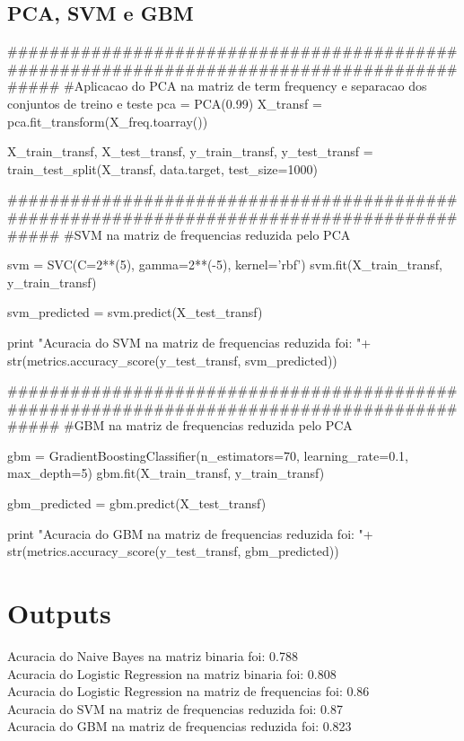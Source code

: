 \documentclass{article}
\begin{document}
\subsection{PCA, SVM e GBM}
\begin{tcolorbox}
\begin{python}
###########################################################################################
#Aplicacao do PCA na matriz de term frequency e separacao dos conjuntos de treino e teste
pca = PCA(0.99)
X_transf = pca.fit_transform(X_freq.toarray())

X_train_transf, X_test_transf, y_train_transf, y_test_transf = train_test_split(X_transf, 
   data.target, test_size=1000)

###########################################################################################
#SVM na matriz de frequencias reduzida pelo PCA

svm = SVC(C=2**(5), gamma=2**(-5), kernel='rbf')
svm.fit(X_train_transf, y_train_transf)

svm_predicted = svm.predict(X_test_transf)

print "Acuracia do SVM na matriz de frequencias reduzida foi: "+
   str(metrics.accuracy_score(y_test_transf, svm_predicted))

###########################################################################################
#GBM na matriz de frequencias reduzida pelo PCA

gbm = GradientBoostingClassifier(n_estimators=70, learning_rate=0.1, max_depth=5)
gbm.fit(X_train_transf, y_train_transf)

gbm_predicted = gbm.predict(X_test_transf)

print "Acuracia do GBM na matriz de frequencias reduzida foi: "+
   str(metrics.accuracy_score(y_test_transf, gbm_predicted))
\end{python}
\end{tcolorbox}

\newpage

\section{Outputs}
\begin{tcolorbox}
Acuracia do Naive Bayes na matriz binaria foi: 0.788 \\
Acuracia do Logistic Regression na matriz binaria foi: 0.808 \\
Acuracia do Logistic Regression na matriz de frequencias foi: 0.86 \\
Acuracia do SVM na matriz de frequencias reduzida foi: 0.87 \\
Acuracia do GBM na matriz de frequencias reduzida foi: 0.823
\end{tcolorbox}
\end{document}
